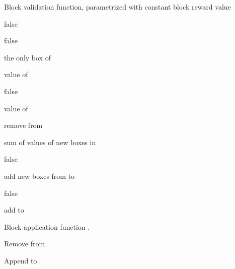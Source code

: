 \documentclass[conference,compsoc]{IEEEtran}
\begin{document}
\begin{algorithm}[H]
\caption{Block validation function, parametrized with constant block reward value }
\label{algo_validate_block}
\begin{algorithmic}[1]

\Return false
\EndIf

\State 


\Return false
\EndIf

\State  the only box of 

\State  value of 

\State 

\State 

\State 

\State 
{}
\Return false
\EndIf

\State  value of 

\State remove  from 
\EndFor

\State  sum of values of new boxes in  

\If{  }
\Return false
\EndIf

\State 
\State add new boxes from  to 
\EndFor


\If{}
\Return false
\EndIf

\State add  to 

\State \Return 

\EndFunction
\end{algorithmic}
\end{algorithm}


\begin{algorithm}[H]
\caption{Block application function .}
\label{algo_apply_block}
\begin{algorithmic}[1]

\Function{  }{  ,   }

\State 


\State Remove  from 
\EndFor

\State Append  to 
\EndFor

\EndFor

\State \Return 

\EndFunction

\end{algorithmic}
\end{algorithm}
\end{document}
